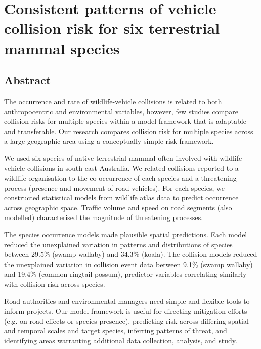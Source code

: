 \chapter{Consistent patterns of vehicle collision risk for six terrestrial mammal species}\label{sec:6sp}
\newpage

\begin{localsize}{11}
\section*{\centering Abstract}

The occurrence and rate of wildlife-vehicle collisions is related to both anthropocentric and environmental variables, however, few studies compare collision risks for multiple species within a model framework that is adaptable and transferable.  Our research compares collision risk for multiple species across a large geographic area using a conceptually simple risk framework.

We used six species of native terrestrial mammal often involved with wildlife-vehicle collisions in south-east Australia.  We related collisions reported to a wildlife organisation to the co-occurrence of each species and a threatening process (presence and movement of road vehicles). For each species, we constructed statistical models from wildlife atlas data to predict occurrence across geographic space. Traffic volume and speed on road segments (also modelled) characterised the magnitude of threatening processes.

The species occurrence models made plausible spatial predictions. Each model reduced the unexplained variation in patterns and distributions of species between 29.5\% (swamp wallaby) and 34.3\% (koala). The collision models reduced the unexplained variation in collision event data between 9.1\% (swamp wallaby) and 19.4\% (common ringtail possum), predictor variables correlating similarly with collision risk across species.

Road authorities and environmental managers need simple and flexible tools to inform projects. Our model framework is useful for directing mitigation efforts (e.g. on road effects or species presence), predicting risk across differing spatial and temporal scales and target species, inferring patterns of threat, and identifying areas warranting additional data collection, analysis, and study.

\end{localsize}

\newpage
